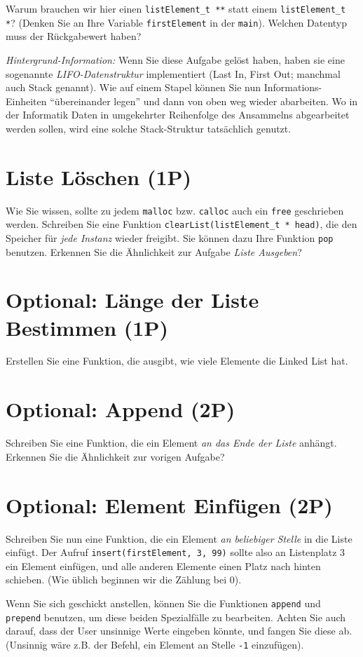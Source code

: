 \documentclass[
	ngerman,
	fontsize=10pt,
	parskip=half,
	titlepage=true,
	DIV=12
]{scrartcl}
\newcommand*{\inC}[1]{\texttt{#1}}
\begin{document}
Warum brauchen wir hier einen \texttt{listElement\_t **} statt einem \texttt{listElement\_t *}? (Denken Sie an Ihre Variable \texttt{firstElement} in der \texttt{main}). Welchen Datentyp muss der Rückgabewert haben?

\emph{Hintergrund-Information:} Wenn Sie diese Aufgabe gelöst haben, haben sie eine sogenannte \emph{LIFO-Datenstruktur} implementiert (Last In, First Out; manchmal auch Stack genannt). Wie auf einem Stapel können Sie nun Informations-Einheiten \enquote{übereinander legen} und dann von oben weg wieder abarbeiten. Wo in der Informatik Daten in umgekehrter Reihenfolge des Ansammelns abgearbeitet werden sollen, wird eine solche Stack-Struktur tatsächlich genutzt.

\section{Liste Löschen (1P)}
Wie Sie wissen, sollte zu jedem \texttt{malloc} bzw. \texttt{calloc} auch ein \texttt{free} geschrieben werden. Schreiben Sie eine Funktion \inC{clearList(listElement_t * head)}, die den Speicher für \emph{jede Instanz} wieder freigibt. Sie können dazu Ihre Funktion \texttt{pop} benutzen. Erkennen Sie die Ähnlichkeit zur Aufgabe \emph{Liste Ausgeben}?

\section{Optional: Länge der Liste Bestimmen (1P)}
Erstellen Sie eine Funktion, die ausgibt, wie viele Elemente die Linked List hat.

\section{Optional: Append (2P)}
Schreiben Sie eine Funktion, die ein Element \emph{an das Ende der Liste} anhängt. Erkennen Sie die Ähnlichkeit zur vorigen Aufgabe?

\section{Optional: Element Einfügen (2P)}
Schreiben Sie nun eine Funktion, die ein Element \emph{an beliebiger Stelle} in die Liste einfügt. Der Aufruf \texttt{insert(firstElement, 3, 99)} sollte also an Listenplatz 3 ein Element einfügen, und alle anderen Elemente einen Platz nach hinten schieben. (Wie üblich beginnen wir die Zählung bei 0).

Wenn Sie sich geschickt anstellen, können Sie die Funktionen \texttt{append} und \texttt{prepend} benutzen, um diese beiden Spezialfälle zu bearbeiten. Achten Sie auch darauf, dass der User unsinnige Werte eingeben könnte, und fangen Sie diese ab. (Unsinnig wäre z.\;B. der Befehl, ein Element an Stelle \texttt{-1} einzufügen).
\end{document}
